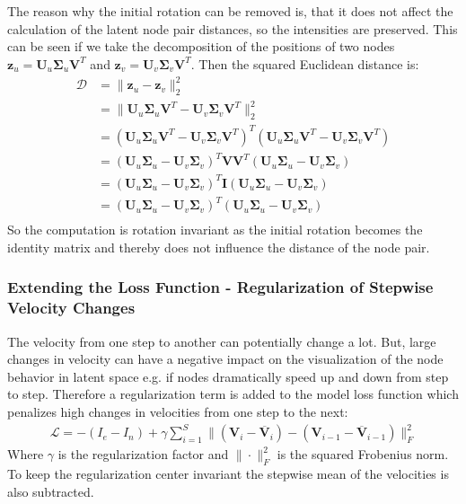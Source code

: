 \\\\
The reason why the initial rotation can be removed is, that it does not affect the calculation of the latent node pair distances, so the intensities are preserved. This can be seen if we take the decomposition of the positions of two nodes $\textbf{z}_u = \textbf{U}_u \boldsymbol{\Sigma}_u \textbf{V}^T$ and $\textbf{z}_v= \textbf{U}_v \boldsymbol{\Sigma}_v \textbf{V}^T$. Then the squared Euclidean distance is:
\begin{align}
      \mathcal{D} &= \rVert \textbf{z}_u - \textbf{z}_v \rVert_2^2 \\
      &= \rVert \textbf{U}_u \boldsymbol{\Sigma}_u \textbf{V}^T - \textbf{U}_v \boldsymbol{\Sigma}_v \textbf{V}^T \rVert_2^2 \\
      &= (\textbf{U}_u \boldsymbol{\Sigma}_u \textbf{V}^T - \textbf{U}_v \boldsymbol{\Sigma}_v \textbf{V}^T)^T (\textbf{U}_u \boldsymbol{\Sigma}_u \textbf{V}^T - \textbf{U}_v \boldsymbol{\Sigma}_v \textbf{V}^T)\\
      &= (\textbf{U}_u \boldsymbol{\Sigma}_u - \textbf{U}_v \boldsymbol{\Sigma}_v)^T\textbf{V} \textbf{V}^T(\textbf{U}_u \boldsymbol{\Sigma}_u - \textbf{U}_v \boldsymbol{\Sigma}_v)\\
      &= (\textbf{U}_u \boldsymbol{\Sigma}_u - \textbf{U}_v \boldsymbol{\Sigma}_v)^T \textbf{I} (\textbf{U}_u \boldsymbol{\Sigma}_u - \textbf{U}_v \boldsymbol{\Sigma}_v)\\
      &= (\textbf{U}_u \boldsymbol{\Sigma}_u - \textbf{U}_v \boldsymbol{\Sigma}_v)^T (\textbf{U}_u \boldsymbol{\Sigma}_u - \textbf{U}_v \boldsymbol{\Sigma}_v)\\
\end{align}
So the computation is rotation invariant as the initial rotation becomes the identity matrix and thereby does not influence the distance of the node pair.


\subsubsection{Extending the Loss Function - Regularization of Stepwise Velocity Changes}
\label{sec:Method:ProposedModel:Regularization}
The velocity from one step to another can potentially change a lot. But, large changes in velocity can have a negative impact on the visualization of the node behavior in latent space e.g. if nodes dramatically speed up and down from step to step.
Therefore a regularization term is added to the model loss function which penalizes high changes in velocities from one step to the next:
\begin{align}
    \mathcal{L} = - (I_e - I_n) + \gamma \sum_{i=1}^{S} \rVert (\textbf{V}_i - \overline{\textbf{V}}_i) - (\textbf{V}_{i-1} - \overline{\textbf{V}}_{i-1}) \rVert_{F}^{2}
    \label{eq:Method:ProposedModel:vec_regularization}
\end{align}
Where $\gamma$ is the regularization factor and $\rVert \cdot \rVert_F^2$ is the squared Frobenius norm. To keep the regularization center invariant the stepwise mean of the velocities is also subtracted.



